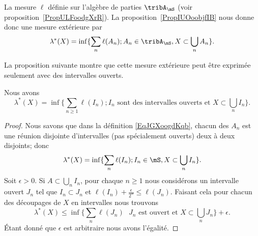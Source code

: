 La mesure \( \ell\) définie sur l'algèbre de parties \( \tribA_{\mS}\) (voir proposition~\ref{PropULFoodgXrR}). La proposition~\ref{PropIUOoobjfIB} nous donne donc une mesure extérieure par
\begin{equation}    \label{EqJGXoogdKqb}
	\lambda^*(X)=\inf\{ \sum_n\ell(A_n);A_n\in\tribA_{\mS},X\subset\bigcup_nA_n \}.
\end{equation}

La proposition suivante montre que cette mesure extérieure peut être exprimée seulement avec des intervalles ouverts.
\begin{proposition} \label{PropTNOooDcfwn}
	Nous avons
	\begin{equation}
		\lambda^*(X)=\inf\{ \sum_{n\geq 1}\ell(I_n); I_n\text{ sont des intervalles ouverts et }X\subset\bigcup_nI_n \}.
	\end{equation}
\end{proposition}

\begin{proof}
	Nous savons que dans la définition \eqref{EqJGXoogdKqb}, chacun des \( A_n\) est une réunion disjointe d'intervalles (pas spécialement ouverts) deux à deux disjoints; donc
	\begin{equation}
		\lambda^*(X)=\inf\{ \sum_n\ell(I_n);I_n\in\mS,X\subset\bigcup_nI_n \}.
	\end{equation}
	Soit \( \epsilon>0\). Si \( A\subset\bigcup_nI_n\), pour chaque \( n\geq 1\) nous considérons un intervalle ouvert \( J_n\) tel que \( I_n\subset J_n\) et \( \ell(I_n)+\frac{ \epsilon }{ 2^n }\leq \ell(J_n)\). Faisant cela pour chacun des découpages de \( X\) en intervalles nous trouvons
	\begin{equation}
		\lambda^*(X)\leq \inf\{ \sum_n\ell(J_n)\text{ } J_n\text{ est ouvert et }X\subset\bigcup_nJ_n \}+\epsilon.
	\end{equation}
	Étant donné que \( \epsilon\) est arbitraire nous avons l'égalité.
\end{proof}

